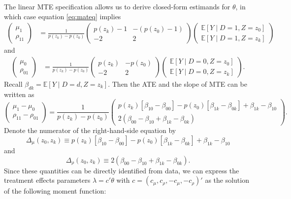 \documentclass[11pt]{article}
\theoremstyle{definition}
\newcommand{\Exp}{\ensuremath{\mathbb{E}}} %
\newcommand{\0}{\ensuremath{\mathbf{0}}}
\begin{document}
\begin{bibunit}
The linear MTE specification allows us to derive closed-form estimands for $\theta$, in which case equation \eqref{eq:mateq} implies
\begin{align*}
	\begin{pmatrix}
	\mu_1 \\
	\rho_{11} 
	\end{pmatrix}
	&=
	\frac{1}{p(z_k) - p(z_0)}
	\begin{pmatrix}
	p(z_k) - 1 & -(p(z_0) - 1) \\
	-2 & 2
	\end{pmatrix}
	\begin{pmatrix}
	\Exp[Y\mid D=1, Z=z_0] \\
	\Exp[Y\mid D=1, Z=z_k]
	\end{pmatrix} 
\end{align*}
and
\begin{align*}
	\begin{pmatrix}
	\mu_0 \\
	\rho_{01} 
	\end{pmatrix}
	&=
	\frac{1}{p(z_k) - p(z_0)}
	\begin{pmatrix}
	p(z_k) & -p(z_0) \\
	-2 & 2
	\end{pmatrix}
	\begin{pmatrix}
	\Exp[Y\mid D=0, Z=z_0] \\
	\Exp[Y\mid D=0, Z=z_k]
	\end{pmatrix}.
\end{align*}
Recall $\beta_{dk} = \Exp[Y\mid D=d, Z=z_k]$. Then the ATE and the slope of MTE can be written as 
\[
	\begin{pmatrix}
	\mu_1 - \mu_0 \\
	\rho_{11} - \rho_{01} 
	\end{pmatrix}
 	=
	\frac{1}{p(z_k) - p(z_0)}
	\begin{pmatrix}
	p(z_k)\left[\beta_{10} - \beta_{00}\right] - p(z_0)\left[\beta_{1k} - \beta_{0k}\right] + \beta_{1k} - \beta_{10} \\
	2\left(\beta_{00} - \beta_{10} + \beta_{1k} - \beta_{0k}\right)
	\end{pmatrix}.
\]
Denote the numerator of the right-hand-side equation by
\[
	\Delta_\mu(z_0, z_k) \equiv p(z_k)\left[\beta_{10} - \beta_{00}\right] - p(z_0)\left[\beta_{1k} - \beta_{0k}\right] + \beta_{1k} - \beta_{10}
\]
and
\[
	\Delta_\rho(z_0, z_k) \equiv 2\left(\beta_{00} - \beta_{10} + \beta_{1k} - \beta_{0k}\right).
\]
Since these quantities can be directly identified from data, we can express the treatment effects parameters $\lambda = c'\theta$ with $c = (c_\mu, c_\rho, -c_\mu, -c_\rho)'$ as the solution of the following moment function:

\end{bibunit}
\end{document}
